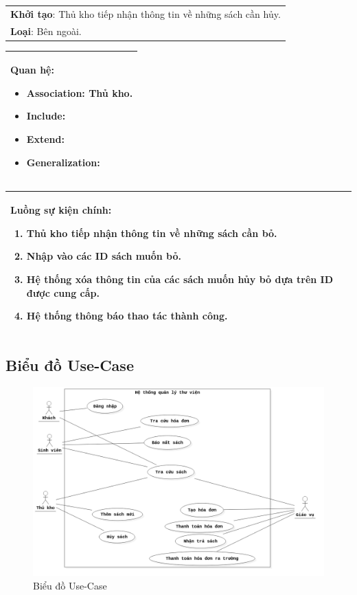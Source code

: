 \documentclass[12pt]{report}
\begin{document}
\begin{center}
\begin{tabular}{| m{15.9cm} |}
    \hline
    \textbf{Khởi tạo}: Thủ kho tiếp nhận thông tin về những sách cần hủy. \\
    \textbf{Loại}: Bên ngoài.  \\
    \hline
\end{tabular}

\begin{tabular}{| m{15.9cm} |}
    \hline
    \textbf{Quan hệ}:
    \begin{itemize}
        \item Association: Thủ kho. 
        \item Include: 
        \item Extend: 
        \item Generalization: 
    \end{itemize} \\
    \hline
\end{tabular}

\begin{tabular}{| m{15.9cm} |}
    \hline
    \textbf{Luồng sự kiện chính}:
    \begin{enumerate}
        \item Thủ kho tiếp nhận thông tin về những sách cần bỏ. 
        \item Nhập vào các ID sách muốn bỏ. 
        \item Hệ thống xóa thông tin của các sách muốn hủy bỏ dựa trên ID được cung cấp. 
        \item Hệ thống thông báo thao tác thành công. 
    \end{enumerate} \\
    \hline
\end{tabular}

\end{center}

\subsection{Biểu đồ Use-Case}
\begin{figure}[H]
\centering
\includegraphics[width=\textwidth]{figures/usecase.png}
\caption{Biểu đồ Use-Case}
\end{figure}
\end{document}
